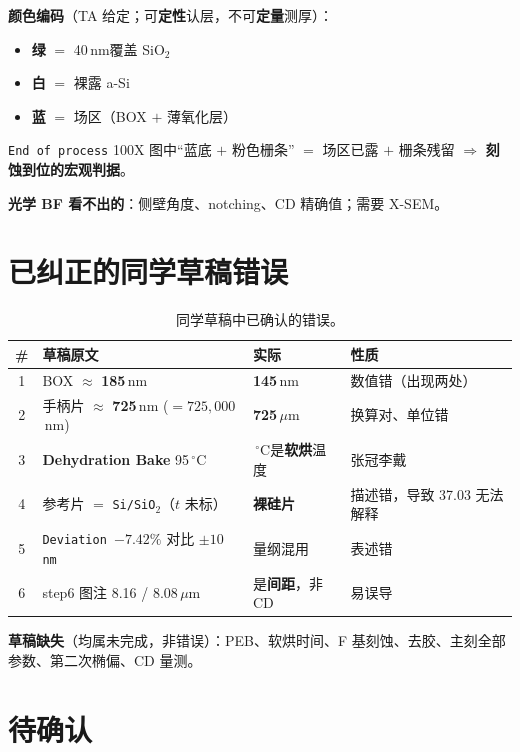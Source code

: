 \documentclass[UTF8,a4paper,11pt,fontset=windows]{ctexart}
\newcommand{\um}{\ensuremath{\,\mu\mathrm{m}}}
\newcommand{\nm}{\ensuremath{\,\mathrm{nm}}}
\newcommand{\degC}{\ensuremath{\,^{\circ}\mathrm{C}}}
\begin{document}
\textbf{颜色编码}（TA 给定；可\textbf{定性}认层，不可\textbf{定量}测厚）：
\begin{itemize}
  \item \textbf{绿} $=$ 40\nm 覆盖 SiO$_2$
  \item \textbf{白} $=$ 裸露 a-Si
  \item \textbf{蓝} $=$ 场区（BOX $+$ 薄氧化层）
\end{itemize}

\texttt{End of process} 100X 图中“蓝底 $+$ 粉色栅条” $=$ 场区已露 $+$ 栅条残留
$\Rightarrow$ \textbf{刻蚀到位的宏观判据}。

\textbf{光学 BF 看不出的}：侧壁角度、notching、CD 精确值；需要 X-SEM。

\section{已纠正的同学草稿错误}

\begin{table}[h]
\centering
\small
\begin{tabularx}{\textwidth}{@{}c >{\raggedright\arraybackslash}p{4.6cm} >{\raggedright\arraybackslash}p{4.0cm} X@{}}
\toprule
\textbf{\#} & \textbf{草稿原文} & \textbf{实际} & \textbf{性质} \\
\midrule
1 & BOX $\approx$ \textbf{185\nm} & \textbf{145\nm} & 数值错（出现两处） \\
2 & 手柄片 $\approx$ \textbf{725\nm} ($=725{,}000$\nm) & \textbf{725\um} & 换算对、单位错 \\
3 & \textbf{Dehydration Bake} 95\degC & 95\degC 是\textbf{软烘}温度 & 张冠李戴 \\
4 & 参考片 $=$ \texttt{Si/SiO$_2$}（$t$ 未标） & \textbf{裸硅片} & 描述错，导致 37.03 无法解释 \\
5 & \texttt{Deviation $-7.42\%$} 对比 \texttt{$\pm10$ nm} & 量纲混用 & 表述错 \\
6 & step6 图注 8.16 / 8.08\um & 是\textbf{间距}，非 CD & 易误导 \\
\bottomrule
\end{tabularx}
\caption{同学草稿中已确认的错误。}
\end{table}

\textbf{草稿缺失}（均属未完成，非错误）：PEB、软烘时间、F 基刻蚀、去胶、主刻全部参数、第二次椭偏、CD 量测。

\section{待确认}
\end{document}
